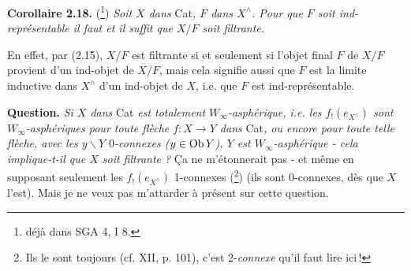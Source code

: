 \noindent\textbf{Corollaire 2.18.} (\footnote[41]{déjà dans SGA 4, I 8.}) \textit{Soit $X$ dans} Cat\textit{, $F$ dans $X^\wedge$. Pour que $F$ soit ind-représentable il faut et il suffit que $X/F$ soit filtrante.}

En effet, par (2.15), $X/F$ est filtrante si et seulement si l'objet final $F$ de $X/F$ provient d'un ind-objet de $X/F$, mais cela signifie aussi que $F$ est la limite inductive dans $X^\wedge$ d'un ind-objet de $X$, i.e. que $F$ est ind-représentable.

\noindent\textbf{Question.} \textit{Si $X$ dans} Cat \textit{est totalement $W_\infty$-asphérique, i.e. les $f_!(e_{X^\wedge})$ sont $W_\infty$-asphériques pour toute flèche $f : X \longrightarrow Y$ dans} Cat\textit{, ou encore pour toute telle flèche, avec les $y\backslash Y$ $0$-connexes ($y \in \operatorname{Ob} Y$), $Y$ est $W_\infty$-asphérique - cela implique-t-il que $X$ soit filtrante ?} Ça ne m'étonnerait pas - et même en supposant seulement les $f_!(e_{X^\wedge})$ 1-connexes (\footnote[42]{Ils le sont toujours (cf. XII, p. 101), c'est 2-\textit{connexe} qu'il faut lire ici\,!}) (ils sont 0-connexes, dès que $X$ l'est). Mais je ne veux pas m'attarder à présent sur cette question.

